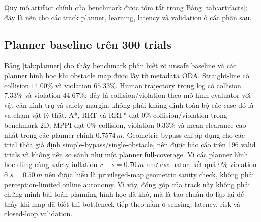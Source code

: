 \documentclass[10pt,letterpaper,twocolumn]{article}
\begin{document}
Quy mô artifact chính của benchmark được tóm tắt trong Bảng \ref{tab:artifacts}; đây là nền cho các track planner, learning, latency và validation ở các phần sau.

\subsection{Planner baseline trên 300 trials}
Bảng \ref{tab:planner} cho thấy benchmark phân biệt rõ unsafe baseline và các planner hình học khi obstacle map được lấy từ metadata ODA. Straight-line có collision \(14.00\%\) và violation \(65.33\%\). Human trajectory trong log có collision \(7.33\%\) và violation \(44.67\%\); đây là collision/violation theo mô hình evaluator với vật cản hình trụ và safety margin, không phải khẳng định toàn bộ các case đó là va chạm vật lý thật. A*, RRT và RRT* đạt \(0\%\) collision/violation trong benchmark 2D; MPPI đạt \(0\%\) collision, violation \(0.33\%\) và mean clearance cao nhất trong các planner chính \(0.7574\,m\). Geometric bypass chỉ áp dụng cho các trial thỏa giả định simple-bypass/single-obstacle, nên được báo cáo trên 196 valid trials và không nên so sánh như một planner full-coverage. Vì các planner hình học dùng cùng safety inflation \(r+s=0.70\,m\) như evaluator, kết quả 0\% violation ở \(s=0.50\,m\) nên được hiểu là privileged-map geometric sanity check, không phải perception-limited online autonomy. Vì vậy, đóng góp của track này không phải chứng minh bài toán planning hình học đã khó, mà là tạo chuẩn đo lặp lại để thấy khi map đã biết thì bottleneck tiếp theo nằm ở sensing, latency, risk và closed-loop validation.

\begin{table}[!t]
\centering
\footnotesize
\caption{Planner safety trên 300 ODA trials.}
\label{tab:planner}
\end{table}
\end{document}

